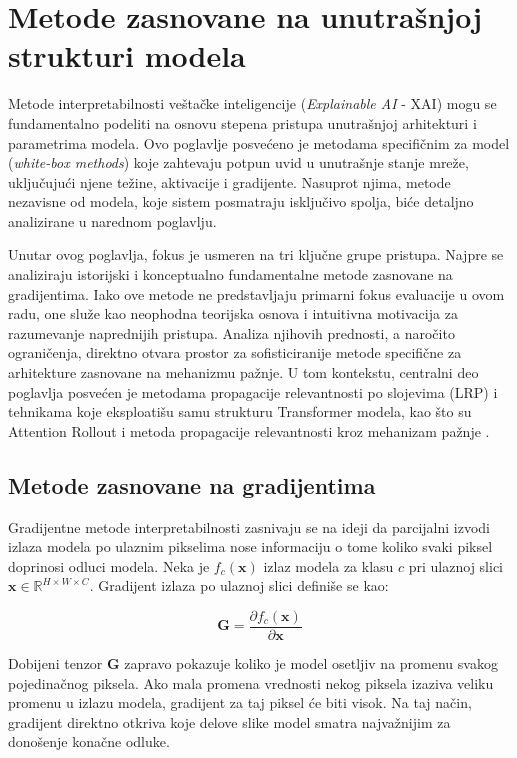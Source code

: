\section{Metode zasnovane na unutrašnjoj strukturi modela}

Metode interpretabilnosti veštačke inteligencije (\textit{Explainable AI} - XAI) mogu se fundamentalno podeliti na osnovu stepena pristupa unutrašnjoj arhitekturi i parametrima modela. Ovo poglavlje posvećeno je metodama specifičnim za model (\textit{white-box methods}) koje zahtevaju potpun uvid u unutrašnje stanje mreže, uključujući njene težine, aktivacije i gradijente. Nasuprot njima, metode nezavisne od modela, koje sistem posmatraju isključivo spolja, biće detaljno analizirane u narednom poglavlju.

Unutar ovog poglavlja, fokus je usmeren na tri ključne grupe pristupa. Najpre se analiziraju istorijski i konceptualno fundamentalne metode zasnovane na gradijentima. Iako ove metode ne predstavljaju primarni fokus evaluacije u ovom radu, one služe kao neophodna teorijska osnova i intuitivna motivacija za razumevanje naprednijih pristupa. Analiza njihovih prednosti, a naročito ograničenja, direktno otvara prostor za sofisticiranije metode specifične za arhitekture zasnovane na mehanizmu pažnje. U tom kontekstu, centralni deo poglavlja posvećen je metodama propagacije relevantnosti po slojevima (LRP) i tehnikama koje eksploatišu samu strukturu Transformer modela, kao što su Attention Rollout \cite{abnar2020quantifying} i metoda propagacije relevantnosti kroz mehanizam pažnje \cite{chefer2021transformer}.

\subsection{Metode zasnovane na gradijentima}

Gradijentne metode interpretabilnosti zasnivaju se na ideji da parcijalni izvodi 
izlaza modela po ulaznim pikselima nose informaciju o tome koliko svaki piksel 
doprinosi odluci modela. Neka je $f_c(\mathbf{x})$ izlaz modela za klasu $c$ pri 
ulaznoj slici $\mathbf{x} \in \mathbb{R}^{H \times W \times C}$. Gradijent izlaza po ulaznoj slici definiše se kao:

\begin{equation}
    \mathbf{G} = \frac{\partial f_c(\mathbf{x})}{\partial \mathbf{x}}
\end{equation}

Dobijeni tenzor $\mathbf{G}$ zapravo pokazuje koliko je model osetljiv na promenu svakog pojedinačnog piksela. Ako mala promena vrednosti nekog piksela izaziva veliku promenu u izlazu modela, gradijent za taj piksel će biti visok. Na taj način, gradijent direktno otkriva koje delove slike model smatra najvažnijim za donošenje konačne odluke.

